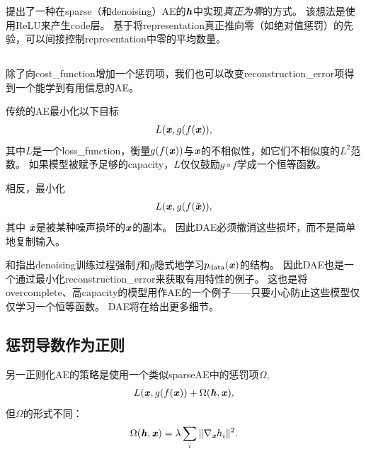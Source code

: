 \citet{Glorot+al-ICML-2011-small}提出了一种在\gls{sparse}（和\gls{denoising}）\gls{AE}的$\boldsymbol{\mathit{h}}$中实现\emph{真正为零}的方式。
该想法是使用\gls{ReLU}来产生\gls{code}层。
基于将\gls{representation}真正推向零（如绝对值惩罚）的先验，可以间接控制\gls{representation}中零的平均数量。



\subsection{}
\label{sec:sub_denoising_autoencoders}
除了向\gls{cost_function}增加一个惩罚项，我们也可以改变\gls{reconstruction_error}项得到一个能学到有用信息的\gls{AE}。


传统的\gls{AE}最小化以下目标
\begin{align}
L(\boldsymbol{\mathit{x}}, g(f(\boldsymbol{\mathit{x}})),
\end{align}
其中$L$是一个\gls{loss_function}，衡量$g(f(\boldsymbol{\mathit{x}}))$与$\boldsymbol{\mathit{x}}$的不相似性，如它们不相似度的$L^2$范数。
如果模型被赋予足够的\gls{capacity}，$L$仅仅鼓励$g \circ  f$学成一个恒等函数。


相反，最小化 
\begin{align}
L(\boldsymbol{\mathit{x}}, g(f(\tilde {\boldsymbol{\mathit{x}}})),
\end{align}
其中 $\tilde {\boldsymbol{\mathit{x}}}$是被某种噪声损坏的$\boldsymbol{\mathit{x}}$的副本。
因此\gls{DAE}必须撤消这些损坏，而不是简单地复制输入。

\citet{Alain+Bengio-ICLR2013-small}和\citet{Bengio-et-al-NIPS2013-small}指出\gls{denoising}训练过程强制$f$和$g$隐式地学习$p_{\text{data}} (\boldsymbol{\mathit{x}})$的结构。
因此\gls{DAE}也是一个通过最小化\gls{reconstruction_error}来获取有用特性的例子。
这也是将\gls{overcomplete}、高\gls{capacity}的模型用作\gls{AE}的一个例子——只要小心防止这些模型仅仅学习一个恒等函数。
\gls{DAE}将在给出更多细节。


\subsection{惩罚导数作为正则}
\label{sec:regularizing_by_penalizing_derivatives}
另一正则化\gls{AE}的策略是使用一个类似\gls{sparse}\gls{AE}中的惩罚项$\Omega$,
\begin{align}
L(\boldsymbol{\mathit{x}}, g(f(\boldsymbol{\mathit{x}})) + \Omega(\boldsymbol{\mathit{h}}, \boldsymbol{\mathit{x}}),
\end{align}
但$\Omega$的形式不同：
\begin{align}
\Omega(\boldsymbol{\mathit{h}}, \boldsymbol{\mathit{x}}) = \lambda \sum_i \| \nabla_{\boldsymbol{\mathit{x}}}h_i \|^2.
\end{align}


